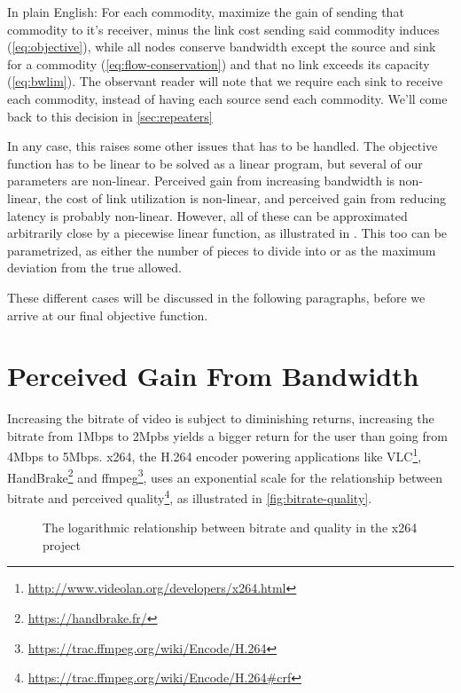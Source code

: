 In plain English: For each commodity, maximize the gain of sending that commodity to it's receiver, minus the link cost sending said commodity induces (\autoref{eq:objective}), while all nodes conserve bandwidth except the source and sink for a commodity (\autoref{eq:flow-conservation}) and that no link exceeds its capacity (\autoref{eq:bwlim}). The observant reader will note that we require each sink to receive each commodity, instead of having each source send each commodity. We'll come back to this decision in \autoref{sec:repeaters}

In any case, this raises some other issues that has to be handled. The objective function has to be linear to be solved as a linear program, but several of our parameters are non-linear. Perceived gain from increasing bandwidth is non-linear, the cost of link utilization is non-linear, and perceived gain from reducing latency is probably non-linear. However, all of these can be approximated arbitrarily close by a piecewise linear function, as illustrated in . This too can be parametrized, as either the number of pieces to divide into or as the maximum deviation from the true allowed.

These different cases will be discussed in the following paragraphs, before we arrive at our final objective function.


\section{Perceived Gain From Bandwidth}

Increasing the bitrate of video is subject to diminishing returns, increasing the bitrate from 1Mbps to 2Mpbs yields a bigger return for the user than going from 4Mbps to 5Mbps. x264, the H.264 encoder powering applications like VLC\footnote{\url{http://www.videolan.org/developers/x264.html}}, HandBrake\footnote{\url{https://handbrake.fr/}} and ffmpeg\footnote{\url{https://trac.ffmpeg.org/wiki/Encode/H.264}}, uses an exponential scale for the relationship between bitrate and perceived quality\footnote{\url{https://trac.ffmpeg.org/wiki/Encode/H.264\#crf}}, as illustrated in \autoref{fig:bitrate-quality}.

\begin{figure}
    \centering


    \caption{The logarithmic relationship between bitrate and quality in the x264 project}
    \label{fig:bitrate-quality}
\end{figure}

